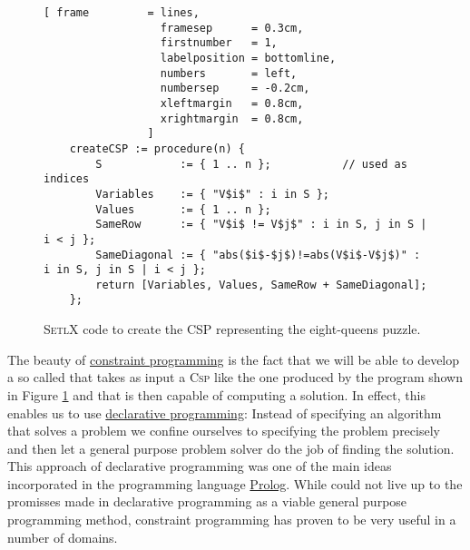 \begin{figure}[!ht]
\centering
\begin{Verbatim}[ frame         = lines, 
                  framesep      = 0.3cm, 
                  firstnumber   = 1,
                  labelposition = bottomline,
                  numbers       = left,
                  numbersep     = -0.2cm,
                  xleftmargin   = 0.8cm,
                  xrightmargin  = 0.8cm,
                ]
    createCSP := procedure(n) {
        S            := { 1 .. n };           // used as indices
        Variables    := { "V$i$" : i in S };
        Values       := { 1 .. n };
        SameRow      := { "V$i$ != V$j$" : i in S, j in S | i < j };
        SameDiagonal := { "abs($i$-$j$)!=abs(V$i$-V$j$)" : i in S, j in S | i < j };
        return [Variables, Values, SameRow + SameDiagonal];
    };
\end{Verbatim}
\vspace*{-0.3cm}
\caption{\textsc{SetlX} code to create the CSP representing the eight-queens puzzle.}
\label{fig:queens-csp.stlx}
\end{figure}

The beauty of \href{https://en.wikipedia.org/wiki/Constraint_programming}{constraint programming} is the fact
that we will be able to develop a so called  that takes as input a \textsc{Csp}
like the one produced by the program shown in Figure \ref{fig:queens-csp.stlx} and that is then capable of
computing a solution.  In effect, this enables us to use
\href{https://en.wikipedia.org/wiki/Declarative_programming}{declarative programming}:  Instead of specifying
an algorithm that solves a problem we confine ourselves to  specifying the problem precisely and then let a
general purpose problem solver do the job of finding the solution.  This approach of declarative programming 
was one of the main ideas incorporated in the programming language
\href{https://en.wikipedia.org/wiki/Prolog}{Prolog}.  While  could not live up to the promisses
made in declarative programming as a viable general purpose programming method, constraint programming has
proven to be very useful in a number of domains. 

